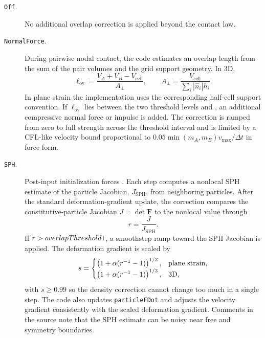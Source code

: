 \begin{description}
  \item[\texttt{Off}.] No additional overlap correction is applied beyond the contact law.

  \item[\texttt{NormalForce}.] During pairwise nodal contact, the code estimates an overlap length from the sum of the pair volumes and the grid support geometry.  In 3D,
  \begin{equation}
    \ell_{\mathrm{ov}}=\frac{V_A+V_B-V_{\mathrm{cell}}}{A_{\perp}},
    \qquad
    A_{\perp}=\frac{V_{\mathrm{cell}}}{\sum_i |\hat n_i|h_i}.
  \end{equation}
  In plane strain the implementation uses the corresponding half-cell support convention.  If $\ell_{\mathrm{ov}}$ lies between the two threshold levels  and , an additional compressive normal force or impulse is added.  The correction is ramped from zero to full strength across the threshold interval and is limited by a CFL-like velocity bound proportional to $0.05\min(m_A,m_B)v_{\max}/\Delta t$ in force form.

  \item[\texttt{SPH}.] Post-input initialization forces .  Each step computes a nonlocal SPH estimate of the particle Jacobian, $J_{\mathrm{SPH}}$, from neighboring particles.  After the standard deformation-gradient update, the correction compares the constitutive-particle Jacobian $J=\det\mathbf{F}$ to the nonlocal value through
  \begin{equation}
    r=\frac{J}{J_{\mathrm{SPH}}}.
  \end{equation}
  If $r>overlapThreshold1$, a smoothstep ramp toward the SPH Jacobian is applied.  The deformation gradient is scaled by
  \begin{equation}
    s=\begin{cases}
      \left(1+\alpha(r^{-1}-1)\right)^{1/2}, & \hbox{plane strain},\\
      \left(1+\alpha(r^{-1}-1)\right)^{1/3}, & \hbox{3D},
    \end{cases}
  \end{equation}
  with $s\ge0.99$ so the density correction cannot change too much in a single step.  The code also updates \texttt{particleFDot} and adjusts the velocity gradient consistently with the scaled deformation gradient.  Comments in the source note that the SPH estimate can be noisy near free and symmetry boundaries.


\end{description}
